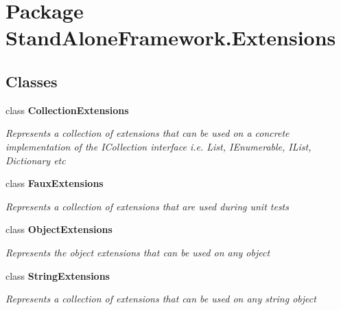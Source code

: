 \hypertarget{namespace_stand_alone_framework_1_1_extensions}{\section{Package Stand\+Alone\+Framework.\+Extensions}
\label{namespace_stand_alone_framework_1_1_extensions}
}
\subsection*{Classes}
\begin{DoxyCompactItemize}
\item 
class {\bfseries Collection\+Extensions}
\begin{DoxyCompactList}\small\item\em Represents a collection of extensions that can be used on a concrete implementation of the I\+Collection interface i.\+e. List, I\+Enumerable, I\+List, Dictionary etc \end{DoxyCompactList}\item 
class {\bfseries Faux\+Extensions}
\begin{DoxyCompactList}\small\item\em Represents a collection of extensions that are used during unit tests \end{DoxyCompactList}\item 
class {\bfseries Object\+Extensions}
\begin{DoxyCompactList}\small\item\em Represents the object extensions that can be used on any object \end{DoxyCompactList}\item 
class {\bfseries String\+Extensions}
\begin{DoxyCompactList}\small\item\em Represents a collection of extensions that can be used on any string object \end{DoxyCompactList}\end{DoxyCompactItemize}
